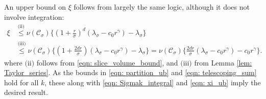 \documentclass[11pt,twoside]{article}
\newcommand{\1}{\mathbf{1}}
\newcommand{\Cset}{\mathcal{C}}
\newcommand{\Csig}{\Cset_{\sigma}}
\begin{document}
	An upper bound on $\xi$ follows from largely the same logic, although it does not involve integration:
	\begin{align}
	\xi & \overset{\text{(ii)}}{\leq} \nu(\Csig) \biggl\{ \left(1 + \frac{ r}{\sigma}\right)^d(\lambda_{\sigma} - c_0r^{\gamma}) - \lambda_{\sigma} \biggr\} \nonumber \\
	& \overset{\text{(iii)}}{\leq} \nu(\Csig) \biggl\{ \left(1 + \frac{2d r}{\sigma}\right)(\lambda_{\sigma} - c_0r^{\gamma}) - \lambda_{\sigma} \biggr\} = \nu(\Csig) \biggl\{ \frac{2dr}{\sigma}(\lambda_{\sigma} - c_0r^{\gamma}) - c_0 r^{\gamma} \biggr\}. \label{eqn: xi_ub}
	\end{align}
	where $\text{(ii)}$ follows from \eqref{eqn: slice_volume_bound}, and $\text{(iii)}$ from Lemma \ref{lem: Taylor_series}. As the bounds in \eqref{eqn: partition_ub} and \eqref{eqn: telescoping_sum} hold for all $k$, these along with \eqref{eqn: Sigmak_integral} and \eqref{eqn: xi_ub} imply the desired result.



\end{document}
